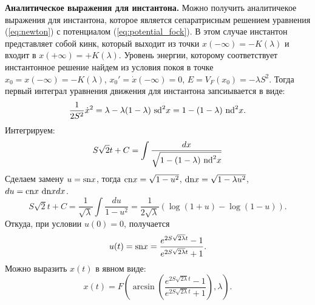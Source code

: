 \documentclass[12pt]{article}
\begin{document}
\textbf{Аналитическое выражения для инстантона.}
Можно получить аналитичекое выражения для инстантона, которое является сепаратрисным решением уравнения (\ref{eq:newton}) с потенциалом (\ref{eq:potential_fock}).
В этом случае инстантон представляет собой кинк, который выходит из точки $x(-\infty) = -K(\lambda)$ и входит в $x(+\infty) = +K(\lambda)$.
Уровень энергии, которому соответствует инстантонное решение найдем из условия покоя в точке $x_0 = x(-\infty) = -K(\lambda)$, $x_0' = \dot{x}(-\infty) = 0$, $E = V_F(x_0) = -\lambda S^2$.
Тогда первый интеграл уравнения движения для инстантона запсиывается в виде:
%
\begin{equation}
\frac{1}{2 S^2} \dot{x}^2 = \lambda - \lambda (1 - \lambda) ~\textrm{sd}^2 x = 1 - (1 - \lambda) ~\textrm{nd}^2 x.
\end{equation}
%
Интегрируем:
%
\begin{equation}
S \sqrt{2} t + C = \int\frac{dx}{\sqrt{1 - (1 - \lambda) ~\textrm{nd}^2 x}}
\end{equation}
%
Сделаем замену $u = \textrm{sn} x$, тогда $\textrm{cn} x = \sqrt{1 - u^2}$, $\textrm{dn} x = \sqrt{1 - \lambda u^2}$, $du = \textrm{cn} x ~\textrm{dn} x dx$.
%
\begin{equation}
S \sqrt{2} t + C = \frac{1}{\sqrt{\lambda}} \int \frac{du}{1 - u^2} = \frac{1}{2\sqrt{\lambda}} (\log(1 + u) - \log(1 - u)).
\end{equation}
%
Откуда, при условии $u(0) = 0$, получается
%
\begin{equation}
u(t) = \textrm{sn} x = \frac{e^{2S\sqrt{2 \lambda} t} - 1}{e^{2S\sqrt{2 \lambda} t} + 1}.
\end{equation}
%
Можно выразить $x(t)$ в явном виде:
%
\begin{equation}
x(t) = F \left(\arcsin \left( \frac{e^{2S\sqrt{2 \lambda} t} - 1}{e^{2S\sqrt{2 \lambda} t} + 1} \right) , \lambda \right).
\label{eq:instanton_fock}
\end{equation}
%
\end{document}

